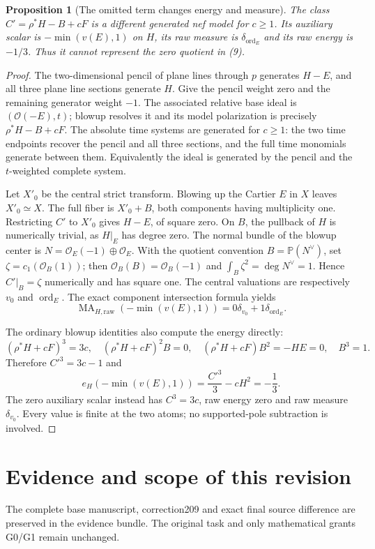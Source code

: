 \documentclass[10pt]{article}
\newtheorem{proposition}[theorem]{Proposition}
\newcommand{\MA}{\operatorname{MA}}
\newcommand{\OO}{\mathcal O}
\begin{document}
\begin{proposition}[The omitted term changes energy and measure]
The class $C'=\rho^*H-B+cF$ is a different generated nef model for
$c\geq1$. Its auxiliary scalar is $-\min(v(E),1)$ on $H$, its raw
measure is $\delta_{\operatorname{ord}_E}$ and its raw energy is
$-1/3$. Thus it cannot represent the zero quotient in (9).
\end{proposition}
\begin{proof}
The two-dimensional pencil of plane lines through $p$ generates
$H-E$, and all three plane line sections generate $H$. Give the
pencil weight zero and the remaining generator weight $-1$.
The associated relative base ideal is $(\OO(-E),t)$; blowup resolves
it and its model polarization is precisely $\rho^*H-B+cF$.
The absolute time systems are generated for $c\geq1$: the two
time endpoints recover the pencil and all three sections, and the
full time monomials generate between them. Equivalently the ideal
is generated by the pencil and the $t$-weighted complete system.

Let $X'_0$ be the central strict transform. Blowing up the Cartier
$E$ in $X$ leaves $X'_0\simeq X$. The full fiber is $X'_0+B$, both
components having multiplicity one. Restricting $C'$ to $X'_0$
gives $H-E$, of square zero. On $B$, the pullback of $H$ is numerically
trivial, as $H|_E$ has degree zero. The normal bundle of the blowup
center is $N=\OO_E(-1)\oplus\OO_E$. With the quotient convention
$B=\mathbb P(N^\vee)$, set $\zeta=c_1(\OO_B(1))$; then
$\OO_B(B)=\OO_B(-1)$ and $\int_B\zeta^2=\deg N^\vee=1$.
Hence $C'|_B=\zeta$ numerically and has square one.
The central valuations are respectively $v_0$ and $\operatorname{ord}_E$.
The exact component intersection formula yields
\[
 \MA_{H,\mathrm{raw}}(-\min(v(E),1))
          =0\delta_{v_0}+1\delta_{\operatorname{ord}_E}. \tag{10}
\]

The ordinary blowup identities also compute the energy directly:
\[
 (\rho^*H+cF)^3=3c,\quad
 (\rho^*H+cF)^2B=0,\quad
 (\rho^*H+cF)B^2=-H E=0,\quad B^3=1.
\]
Therefore $C'^3=3c-1$ and
\[
 e_H(-\min(v(E),1))=\frac{C'^3}{3}-cH^2=-\frac13.     \tag{11}
\]
The zero auxiliary scalar instead has $C^3=3c$, raw energy zero
and raw measure $\delta_{v_0}$. Every value is finite at the two
atoms; no supported-pole subtraction is involved.
\end{proof}


\section{Evidence and scope of this revision}
The complete base manuscript, correction209 and exact final source
difference are preserved in the evidence bundle. The original task and
only mathematical grants G0/G1 remain unchanged.
\end{document}
